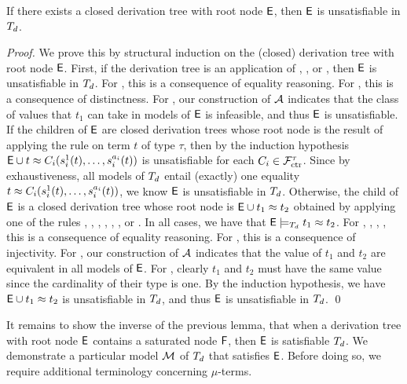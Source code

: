 \begin{lemma}%
\label{lem:rs}%
\afterDot
If there exists a closed derivation tree with root node $\mathsf{E}$, then $\mathsf{E}$ is unsatisfiable in $T_{d}$.
\end{lemma}
\begin{proof}
We prove this by structural induction on the (closed) derivation tree with root node $\mathsf{E}$.
First, if the derivation tree is an application of , , or ,
then $\mathsf{E}$ is unsatisfiable in $T_{d}$.
For , this is a consequence of equality reasoning.
For , this is a consequence of distinctness.
For , our construction of $\mathcal{A}$ indicates that the class of values that $t_1$ can take in models of $\mathsf{E}$ is infeasible,
and thus $\mathsf{E}$ is unsatisfiable.
If the children of $\mathsf{E}$ are closed derivation trees 
whose root node is the result of applying the rule  on term $t$ of type $\tau$,
then by the induction hypothesis $\mathsf{E} \cup t \approx C_i( s^1_i( t ), \ldots, s^{a_i}_i( t ) )$ is unsatisfiable
for each $C_i \in \mathcal{F}_{\mathrm{ctr}}^\tau$.
Since by exhaustiveness, all models of $T_{d}$ entail (exactly) one equality $t \approx C_i( s^1_i( t ), \ldots, s^{a_i}_i( t ) )$,
we know $\mathsf{E}$ is unsatisfiable in $T_{d}$.
Otherwise, the child of $\mathsf{E}$ is a closed derivation tree 
whose root node is $\mathsf{E} \cup t_1 \approx t_2$ obtained by applying one of the rules , , , , , , or .
In all cases, we have that $\mathsf{E} \models_{T_{d}} t_1 \approx t_2$.
For , , , , this is a consequence of equality reasoning.
For , this is a consequence of injectivity.
For , our construction of $\mathcal{A}$ indicates that the value of $t_1$ and $t_2$ are equivalent in all models of $\mathsf{E}$.
For , clearly $t_1$ and $t_2$ must have the same value since the cardinality of their type is one.
By the induction hypothesis, we have $\mathsf{E} \cup t_1 \approx t_2$ is unsatisfiable in $T_{d}$, 
and thus $\mathsf{E}$ is unsatisfiable in $T_{d}$.
\qed
\end{proof}

It remains to show the inverse of the previous lemma, that when a derivation tree with root node $\mathsf{E}$ contains a saturated node $\mathsf{F}$,
then $\mathsf{E}$ is satisfiable $T_{d}$.
We demonstrate a particular model $\mathcal{M}$ of $T_{d}$ that satisfies $\mathsf{E}$.
Before doing so, we require additional terminology concerning $\mu$-terms.

